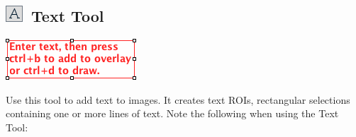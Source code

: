 

\subsection[Text Tool]{\noindent \textsf{\protect\includegraphics[bb=0bp 5bp 20bp 20bp,scale=0.6]{images/tools/Text}}~Text
Tool\label{sec:Text-Tool}}

\begin{minipage}[c][1\totalheight][t]{0.3\columnwidth}%
\includegraphics[scale=0.6]{images/TextTool}%
\end{minipage}%
\begin{minipage}[c][1\totalheight][t]{0.7\columnwidth}%
Use this tool to add text to images. It creates text ROIs, rectangular
selections containing one or more lines of text. Note the following
when using the Text Tool: %
\end{minipage}
